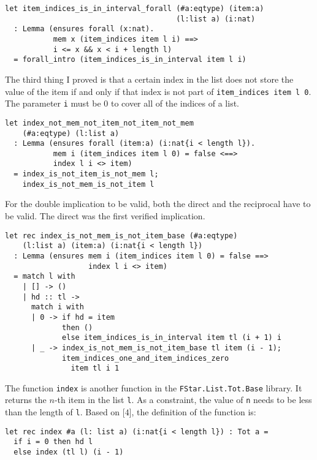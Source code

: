 \begin{verbatim}
let item_indices_is_in_interval_forall (#a:eqtype) (item:a) 
                                       (l:list a) (i:nat)
  : Lemma (ensures forall (x:nat). 
           mem x (item_indices item l i) ==> 
           i <= x && x < i + length l) 
  = forall_intro (item_indices_is_in_interval item l i)
\end{verbatim}

The third thing I proved is that a certain index in the list does not store the value of the item if and only if that index is not part of \texttt{item\_indices item l 0}. The parameter \texttt{i} must be \(0\) to cover all of the indices of a list.

\begin{verbatim}
let index_not_mem_not_item_not_item_not_mem 
    (#a:eqtype) (l:list a)
  : Lemma (ensures forall (item:a) (i:nat{i < length l}).
           mem i (item_indices item l 0) = false <==>
           index l i <> item)
  = index_is_not_item_is_not_mem l;
    index_is_not_mem_is_not_item l
\end{verbatim}

For the double implication to be valid, both the direct and the reciprocal have to be valid. The direct was the first verified implication.

\begin{verbatim}
let rec index_is_not_mem_is_not_item_base (#a:eqtype) 
    (l:list a) (item:a) (i:nat{i < length l})
  : Lemma (ensures mem i (item_indices item l 0) = false ==>
                   index l i <> item)
  = match l with  
    | [] -> ()
    | hd :: tl -> 
      match i with  
      | 0 -> if hd = item 
             then ()
             else item_indices_is_in_interval item tl (i + 1) i
      | _ -> index_is_not_mem_is_not_item_base tl item (i - 1);
             item_indices_one_and_item_indices_zero 
               item tl i 1
\end{verbatim}

The function \texttt{index} is another function in the \texttt{FStar.List.Tot.Base} library. It returns the \(n\)-th item in the list \texttt{l}. As a constraint, the value of \texttt{n} needs to be less than the length of \texttt{l}. Based on [\(4\)], the definition of the function is:

\begin{verbatim}
let rec index #a (l: list a) (i:nat{i < length l}) : Tot a =
  if i = 0 then hd l 
  else index (tl l) (i - 1)
\end{verbatim}

